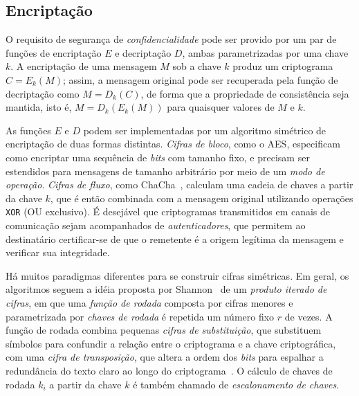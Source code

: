 \documentclass{SBCbookchapter}
\begin{document}
\subsection{Encriptação}

O requisito de segurança de \emph{confidencialidade} pode ser provido por um par de funções de encriptação $E$ e decriptação $D$, ambas parametrizadas por uma chave $k$. A encriptação de uma mensagem $M$ sob a chave $k$ produz um criptograma $C = E_k(M)$; assim, a mensagem original pode ser recuperada pela função de decriptação como $M = D_k(C)$, de forma que a propriedade de consistência seja mantida, isto é, $M = D_k(E_k(M))$ para quaisquer valores de $M$ e $k$.

As funções $E$ e $D$ podem ser implementadas por um algoritmo simétrico de encriptação de duas formas distintas. \emph{Cifras de bloco}, como o AES, especificam como encriptar uma sequência de \emph{bits} com tamanho fixo, e precisam ser estendidos para mensagens de tamanho arbitrário por meio de um \emph{modo de operação}. \emph{Cifras de fluxo}, como ChaCha~\cite{Chachaspec}, calculam uma cadeia de chaves a partir da chave $k$, que é então combinada com a mensagem original utilizando operações \texttt{XOR} (OU exclusivo). É desejável que criptogramas transmitidos em canais de comunicação sejam acompanhados de \emph{autenticadores}, que permitem ao destinatário certificar-se de que o remetente é a origem legítima da mensagem e verificar sua integridade.

Há muitos paradigmas diferentes para se construir cifras simétricas. Em geral, os algoritmos seguem a idéia proposta por Shannon~\cite{Shannon49} de um \emph{produto iterado de cifras}, em que uma \emph{função de rodada} composta por cifras menores e parametrizada por \emph{chaves de rodada} é repetida um número fixo $r$ de vezes. A função de rodada combina pequenas \emph{cifras de substituição}, que substituem símbolos para confundir a relação entre o criptograma e a chave criptográfica, com uma \emph{cifra de transposição}, que altera a ordem dos \emph{bits} para espalhar a redundância do texto claro ao longo do criptograma~\cite{Shannon49}. O cálculo de chaves de rodada $k_i$ a partir da chave $k$ é também chamado de \emph{escalonamento de chaves}.
\end{document}
